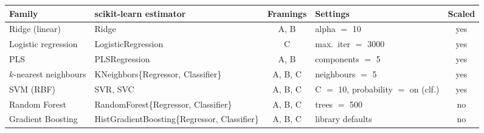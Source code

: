 \begin{tabular}{@{}>{\raggedright\arraybackslash}p{2.9cm}>{\raggedright\arraybackslash}p{4.5cm}c>{\raggedright\arraybackslash}p{4.3cm}c@{}}
\toprule
Family & scikit-learn estimator & Framings & Settings & Scaled \\
\midrule
Ridge (linear) & Ridge & A, B & alpha $=$ 10 & yes \\
Logistic regression & LogisticRegression & C & max.\ iter $=$ 3000 & yes \\
PLS & PLSRegression & A, B & components $=$ 5 & yes \\
$k$-nearest neighbours & KNeighbors\allowbreak\{Regressor, Classifier\} & A, B, C & neighbours $=$ 5 & yes \\
SVM (RBF) & SVR, SVC & A, B, C & C $=$ 10, probability $=$ on (clf.) & yes \\
Random Forest & RandomForest\allowbreak\{Regressor, Classifier\} & A, B, C & trees $=$ 500 & no \\
Gradient Boosting & HistGradientBoosting\allowbreak\{Regressor, Classifier\} & A, B, C & library defaults & no \\
\bottomrule
\end{tabular}
